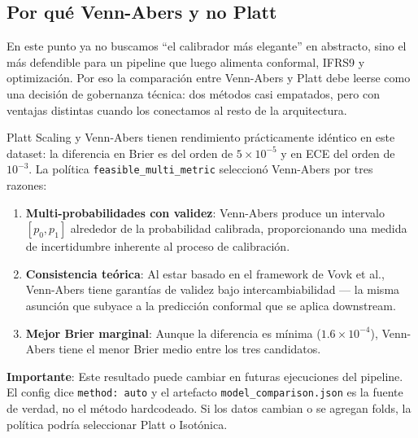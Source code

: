 \documentclass[
  spanish,
  11pt,
  letterpaper,
]{scrbook}
\providecommand{\tightlist}{%
  \setlength{\itemsep}{0pt}\setlength{\parskip}{0pt}}
\theoremstyle{plain}
\theoremstyle{remark}
\begin{document}
\subsection{Por qué Venn-Abers y no Platt}\label{sec-why-venn-abers}

En este punto ya no buscamos ``el calibrador más elegante'' en
abstracto, sino el más defendible para un pipeline que luego alimenta
conformal, IFRS9 y optimización. Por eso la comparación entre Venn-Abers
y Platt debe leerse como una decisión de gobernanza técnica: dos métodos
casi empatados, pero con ventajas distintas cuando los conectamos al
resto de la arquitectura.

\begin{tcolorbox}[enhanced jigsaw, arc=.35mm, bottomrule=.15mm, bottomtitle=1mm, breakable, colback=white, colbacktitle=quarto-callout-note-color!10!white, colframe=quarto-callout-note-color-frame, coltitle=black, left=2mm, leftrule=.75mm, opacityback=0, opacitybacktitle=0.6, rightrule=.15mm, title=\textcolor{quarto-callout-note-color}{\faInfo}\hspace{0.5em}{Selección del calibrador: Venn-Abers}, titlerule=0mm, toprule=.15mm, toptitle=1mm]

Platt Scaling y Venn-Abers tienen rendimiento prácticamente idéntico en
este dataset: la diferencia en Brier es del orden de
\(5 \times 10^{-5}\) y en ECE del orden de \(10^{-3}\). La política
\texttt{feasible\_multi\_metric} seleccionó Venn-Abers por tres razones:

\begin{enumerate}
\def\labelenumi{\arabic{enumi}.}
\tightlist
\item
  \textbf{Multi-probabilidades con validez}: Venn-Abers produce un
  intervalo \([p_0, p_1]\) alrededor de la probabilidad calibrada,
  proporcionando una medida de incertidumbre inherente al proceso de
  calibración.
\item
  \textbf{Consistencia teórica}: Al estar basado en el framework de Vovk
  et al., Venn-Abers tiene garantías de validez bajo intercambiabilidad
  --- la misma asunción que subyace a la predicción conformal que se
  aplica downstream.
\item
  \textbf{Mejor Brier marginal}: Aunque la diferencia es mínima
  (\(1.6 \times 10^{-4}\)), Venn-Abers tiene el menor Brier medio entre
  los tres candidatos.
\end{enumerate}

\textbf{Importante}: Este resultado puede cambiar en futuras ejecuciones
del pipeline. El config dice \texttt{method:\ auto} y el artefacto
\texttt{model\_comparison.json} es la fuente de verdad, no el método
hardcodeado. Si los datos cambian o se agregan folds, la política podría
seleccionar Platt o Isotónica.

\end{tcolorbox}
\end{document}
